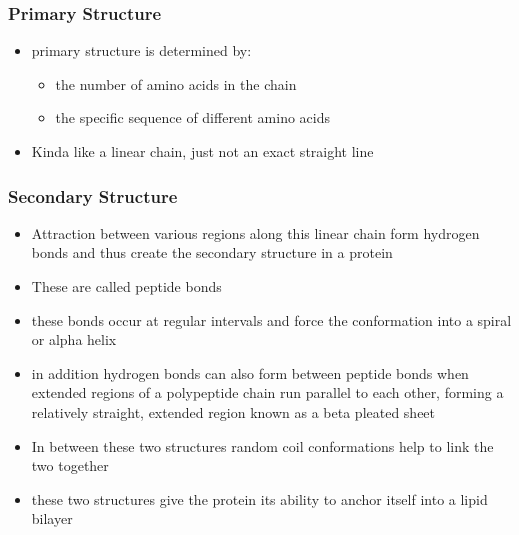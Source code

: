 \documentclass[11pt]{article}
\begin{document}
\subsubsection{Primary Structure}
\label{sec:org1e7804b}
\begin{itemize}
\item primary structure is determined by:
\begin{itemize}
\item the number of amino acids in the chain
\item the specific sequence of different amino acids
\end{itemize}
\item Kinda like a linear chain, just not an exact straight line
\end{itemize}
\subsubsection{Secondary Structure}
\label{sec:org8345e1e}
\begin{itemize}
\item Attraction between various regions along this linear chain form hydrogen bonds and thus create the secondary structure in a protein
\item These are called peptide bonds
\item these bonds occur at regular intervals and force the conformation into a spiral or alpha helix
\item in addition hydrogen bonds can also form between peptide bonds when extended regions of a polypeptide chain run parallel to each other, forming a relatively straight, extended region known as a beta pleated sheet
\item In between these two structures random coil conformations help to link the two together
\item these two structures give the protein its ability to anchor itself into a lipid bilayer
\end{itemize}
\end{document}
